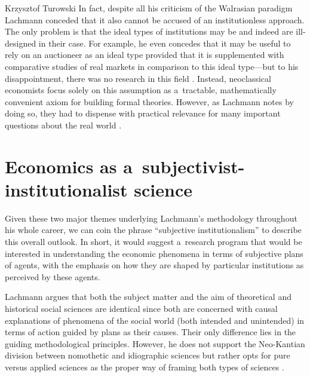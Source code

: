 \begin{artengenv}{Krzysztof Turowski}
In fact, despite all his criticism of the Walrasian paradigm Lachmann conceded that it also cannot be accused of an institutionless approach.
The only problem is that the ideal types of institutions may be and indeed are ill-designed in their case.
For example, he even concedes that it may be useful to rely on an auctioneer as an ideal type provided that it is supplemented with comparative studies of real markets in comparison to this ideal type---but to his disappointment, there was no research in this field \parencite[40--41]{lachmann1986market}.
Instead, neoclassical economists focus solely on this assumption as a~tractable, mathematically convenient axiom for building formal theories. However, as Lachmann notes by doing so, they had to dispense with practical relevance for many important questions about the real world \parencite[142]{lachmann1986market}.

\section{Economics as a~subjectivist-institutionalist science}
\label{sec:inspirations}

Given these two major themes underlying Lachmann's methodology throughout his whole career, we can coin the phrase ``subjective institutionalism'' to describe this overall outlook.
In short, it would suggest a~research program that would be interested in understanding the economic phenomena in terms of subjective plans of agents, with the emphasis on how they are shaped by particular institutions as perceived by these agents.

Lachmann argues that both the subject matter and the aim of theoretical and historical social sciences are identical since both are concerned with causal explanations of phenomena of the social world (both intended and unintended) in terms of action guided by plans as their causes.
Their only difference lies in the guiding methodological principles.
However, he does not support the Neo-Kantian division between nomothetic and idiographic sciences but rather opts for pure versus applied sciences as the proper way of framing both types of sciences \parencite[173--175]{lachmann-science}.


\end{artengenv}
